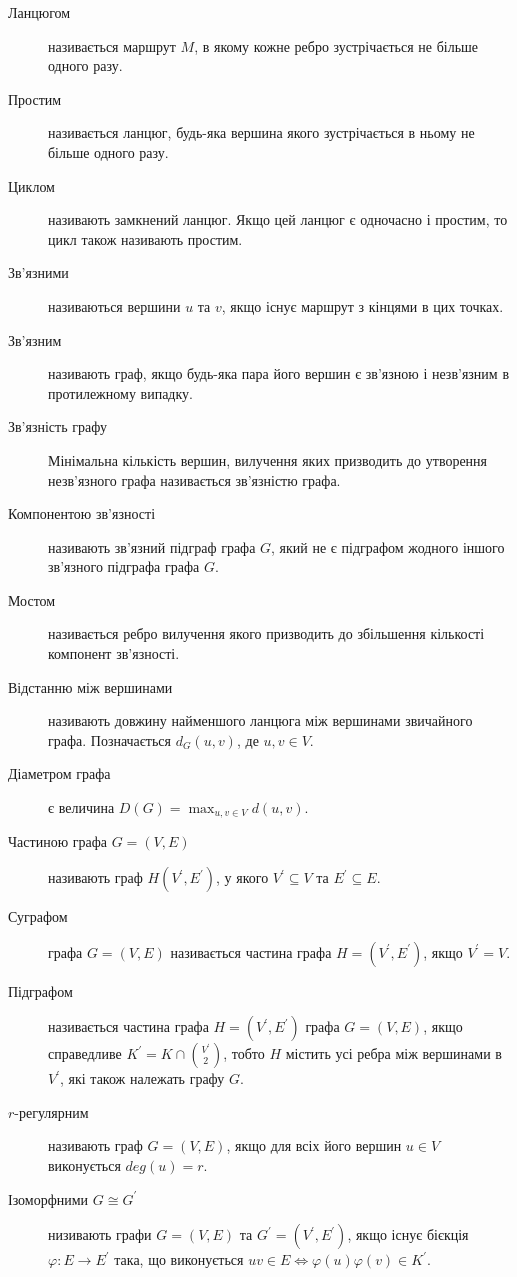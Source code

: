 \begin{description}
\item[Ланцюгом] називається маршрут $M$, в якому кожне ребро зустрічається не більше одного разу.
\item[Простим] називається ланцюг, будь-яка вершина якого зустрічається в ньому не більше одного разу.
\item[Циклом] називають замкнений ланцюг. Якщо цей ланцюг є одночасно і простим, то цикл також називають простим.
\item[Зв'язними] називаються вершини $u$ та $v$, якщо існує маршрут з кінцями в цих точках.
\item[Зв'язним] називають граф, якщо будь-яка пара його вершин є зв'язною і незв'язним в протилежному випадку.
\item[Зв'язність графу] Мінімальна кількість вершин, вилучення яких призводить до утворення незв'язного графа називається зв'язністю графа.
\item[Компонентою зв'язності] називають зв'язний підграф графа $G$, який не є підграфом жодного іншого зв'язного підграфа графа $G$.
\item[Мостом] називається ребро вилучення якого призводить до збільшення кількості компонент зв'язності.
\item[Відстанню між вершинами] називають довжину найменшого ланцюга між вершинами звичайного графа. Позначається $d_G(u,v)$, де $u,v \in V$.
\item[Діаметром графа] є величина $D(G) = \displaystyle{\max_{u,v \in V}d(u,v)}$.
\item[Частиною графа $G=(V,E)$] називають граф $H(V^\prime,E^\prime)$, у якого $V^\prime \subseteq V$ та $E^\prime \subseteq E$.
\item[Суграфом] графа $G=(V,E)$ називається частина графа $H=(V^\prime,E^\prime)$, якщо $V^\prime=V$.
\item[Підграфом] називається частина графа $H=(V^\prime,E^\prime)$ графа $G=(V,E)$, якщо справедливе $K^\prime=K\cap {V^\prime \choose 2}$, тобто $H$ містить усі ребра між вершинами в $V^\prime$, які також належать графу $G$.
\item[$r$-регулярним] називають граф $G=(V,E)$, якщо для всіх його вершин $u \in V$ виконується $deg(u)=r$.
\item[Ізоморфними $G \cong G^\prime$] низивають графи $G = (V,E)$ та $G^\prime = (V^\prime,E^\prime)$, якщо існує бієкція $\varphi : E \to E^\prime$ така, що виконується $uv \in E \Leftrightarrow \varphi (u)\varphi (v) \in K^\prime$.
\end{description}
